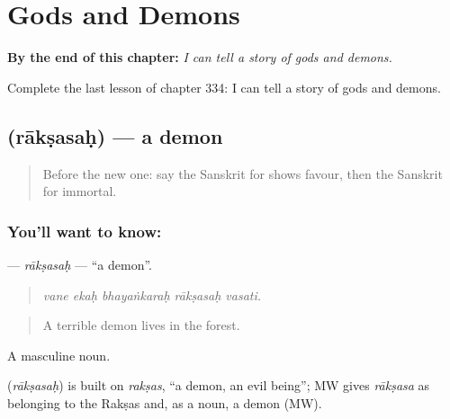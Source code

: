 
\chapter{Gods and Demons}
\label{ch:sa-gods-and-demons}

\begin{chapteropening}
\textbf{By the end of this chapter:} \emph{I can tell a story of gods and demons.}

Complete the last lesson of chapter 334: I can tell a story of gods and demons.
\end{chapteropening}

\section[\texorpdfstring{\sk{राक्षसः} (rākṣasaḥ)}{राक्षसः (rākṣasaḥ)}]{ (rākṣasaḥ) — a demon}

\label{lesson:SA-C334-raksasah}



\begin{quote}
Before the new one: say the Sanskrit for shows favour, then the Sanskrit for immortal.
\end{quote}

\subsection*{You'll want to know: }
\textbf{} — \emph{rākṣasaḥ} — \textquotedblleft{}a demon\textquotedblright{}.

\begin{quote}
    
\end{quote}

\begin{quote}
\emph{vane ekaḥ bhayaṅkaraḥ rākṣasaḥ vasati.}
\end{quote}

\begin{quote}
A terrible demon lives in the forest.
\end{quote}

A masculine noun.

\begin{cousinweb}
\textbf{} (\emph{rākṣasaḥ}) is built on \emph{rakṣas}, \textquotedblleft{}a demon, an evil being\textquotedblright{}; MW gives \emph{rākṣasa} as belonging to the Rakṣas and, as a noun, a demon (MW).
\end{cousinweb}

